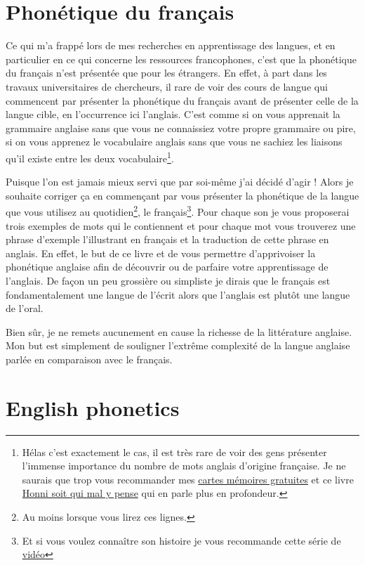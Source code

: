 \documentclass[12pt,a4paper]{book}
\begin{document}
\part{Phonétique du français}
Ce qui m'a frappé lors de mes recherches en apprentissage des langues,
et en particulier en ce qui concerne les ressources francophones,
c'est que la phonétique du français n'est présentée que pour les
étrangers. En effet, à part dans les travaux universitaires de
chercheurs, il rare de voir des cours de langue qui commencent par
présenter la phonétique du français avant de présenter celle de la
langue cible, en l'occurrence ici l'anglais. C'est comme si on vous
apprenait la grammaire anglaise sans que vous ne connaissiez votre
propre grammaire ou pire, si on vous apprenez le vocabulaire anglais
sans que vous ne sachiez les liaisons qu'il existe entre les deux
vocabulaire\footnote{Hélas c'est exactement le cas, il est très rare
  de voir des gens présenter l'immense importance du nombre de mots
  anglais d'origine française. Je ne saurais que trop vous recommander
mes
\href{https://tinycards.duolingo.com/decks/6VNKUdba/english-words-with-french-origin}{cartes
  mémoires gratuites} et ce livre
\href{https://www.amazon.fr/gp/product/225315444X/ref=as_li_tl?ie=UTF8&camp=1642&creative=6746&creativeASIN=225315444X&linkCode=as2&tag=wwwbecomefree-21&linkId=5317e7b0e063b4d6c7c676b11420e49d}{Honni
  soit qui mal y pense} qui en parle plus en profondeur.}.\par
Puisque l'on est jamais mieux servi que par soi-même j'ai décidé
d'agir ! Alors je souhaite corriger ça en commençant par vous
présenter la phonétique de la langue que vous utilisez au
quotidien\footnote{Au moins lorsque vous lirez ces lignes.}, le
français\footnote{Et si vous voulez connaître son histoire je vous
  recommande cette série de \href{https://www.youtube.com/watch?v=rHSIPt_ehvc&list=PLH2hhYn999aRfv2odG4SozTXCHbZaX_ji}{vidéo}}. Pour
chaque son je vous proposerai trois exemples de mots qui le
contiennent et pour chaque mot vous trouverez une phrase d'exemple
l'illustrant en français et la traduction de cette phrase en
anglais. En effet, le but de ce livre et de vous permettre
d'apprivoiser la phonétique anglaise afin de découvrir ou de parfaire
votre apprentissage de l'anglais. De façon un peu grossière ou
simpliste je dirais que le français est fondamentalement une langue de
l'écrit alors que l'anglais est plutôt une langue de l'oral.\par
Bien sûr, je ne remets aucunement en cause la richesse de la
littérature anglaise. Mon but est simplement de souligner l'extrême
complexité de la langue anglaise parlée en comparaison avec le
français.\par

%





\part{English phonetics}

\parttoc

%




\end{document}
